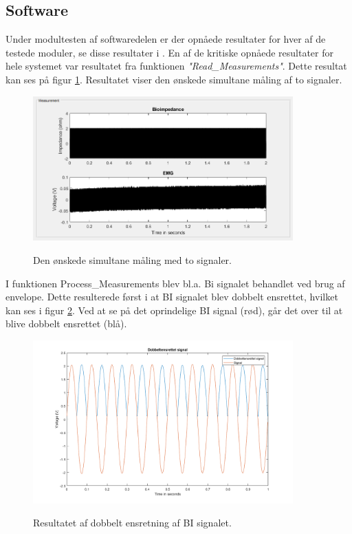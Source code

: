 \subsection{Software}

Under modultesten af softwaredelen er der opnåede resultater for hver af de testede moduler, se disse resultater i . En af de kritiske opnåede resultater for hele systemet var resultatet fra funktionen \textit{"Read\_Measurements"}. Dette resultat kan ses på figur \ref{fig:modultestshow}. Resultatet viser den ønskede simultane måling af to signaler. 

\begin{figure}[H] 
\centering
{\includegraphics[width=10cm]
{Figure/modultestshow}}
\caption{Den ønskede simultane måling med to signaler.}
\label{fig:modultestshow}
\end{figure}


I funktionen Process\_Measurements blev bl.a. Bi signalet behandlet ved brug af envelope. Dette resulterede først i at BI signalet blev dobbelt ensrettet, hvilket kan ses i figur \ref{fig:modultestprocessEnsrettet}. Ved at se på det oprindelige BI signal (rød), går det over til at blive dobbelt ensrettet (blå). 

\begin{figure}[H] 
\centering
{\includegraphics[width=10cm]
{Figure/modultestprocessEnsrettet}}
\caption{Resultatet af dobbelt ensretning af BI signalet.}
\label{fig:modultestprocessEnsrettet}
\end{figure}

